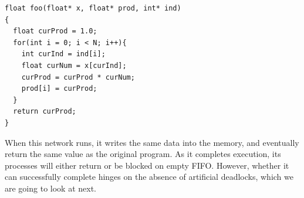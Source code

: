 \documentclass{sig-alternate}
\begin{document}

\begin{lstlisting}
float foo(float* x, float* prod, int* ind)
{
  float curProd = 1.0;
  for(int i = 0; i < N; i++){
    int curInd = ind[i];
    float curNum = x[curInd];
    curProd = curProd * curNum;
    prod[i] = curProd;
  }
  return curProd;
}
\end{lstlisting}
When this network runs, it writes the same data into the memory, and eventually return
the same value as the original program. As it completes execution, its processes will either return or be blocked on empty FIFO. However, whether it can successfully complete hinges on
the absence of artificial deadlocks, which we are going to look at next.

\end{document}
